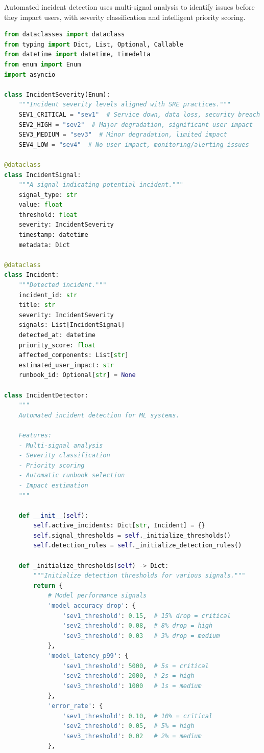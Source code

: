 Automated incident detection uses multi-signal analysis to identify issues before they impact users, with severity classification and intelligent priority scoring.

\begin{lstlisting}[language=Python, caption={Automated IncidentDetector with ML-Specific Signals}]
from dataclasses import dataclass
from typing import Dict, List, Optional, Callable
from datetime import datetime, timedelta
from enum import Enum
import asyncio

class IncidentSeverity(Enum):
    """Incident severity levels aligned with SRE practices."""
    SEV1_CRITICAL = "sev1"  # Service down, data loss, security breach
    SEV2_HIGH = "sev2"  # Major degradation, significant user impact
    SEV3_MEDIUM = "sev3"  # Minor degradation, limited impact
    SEV4_LOW = "sev4"  # No user impact, monitoring/alerting issues

@dataclass
class IncidentSignal:
    """A signal indicating potential incident."""
    signal_type: str
    value: float
    threshold: float
    severity: IncidentSeverity
    timestamp: datetime
    metadata: Dict

@dataclass
class Incident:
    """Detected incident."""
    incident_id: str
    title: str
    severity: IncidentSeverity
    signals: List[IncidentSignal]
    detected_at: datetime
    priority_score: float
    affected_components: List[str]
    estimated_user_impact: str
    runbook_id: Optional[str] = None

class IncidentDetector:
    """
    Automated incident detection for ML systems.

    Features:
    - Multi-signal analysis
    - Severity classification
    - Priority scoring
    - Automatic runbook selection
    - Impact estimation
    """

    def __init__(self):
        self.active_incidents: Dict[str, Incident] = {}
        self.signal_thresholds = self._initialize_thresholds()
        self.detection_rules = self._initialize_detection_rules()

    def _initialize_thresholds(self) -> Dict:
        """Initialize detection thresholds for various signals."""
        return {
            # Model performance signals
            'model_accuracy_drop': {
                'sev1_threshold': 0.15,  # 15% drop = critical
                'sev2_threshold': 0.08,  # 8% drop = high
                'sev3_threshold': 0.03   # 3% drop = medium
            },
            'model_latency_p99': {
                'sev1_threshold': 5000,  # 5s = critical
                'sev2_threshold': 2000,  # 2s = high
                'sev3_threshold': 1000   # 1s = medium
            },
            'error_rate': {
                'sev1_threshold': 0.10,  # 10% = critical
                'sev2_threshold': 0.05,  # 5% = high
                'sev3_threshold': 0.02   # 2% = medium
            },


\end{lstlisting}
